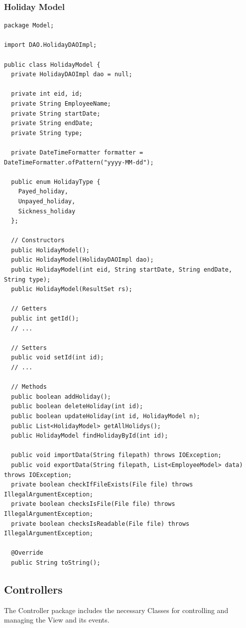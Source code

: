 \documentclass[12pt]{article}
\begin{document}
\subsubsection{Holiday Model}
\begin{lstlisting}
package Model;

import DAO.HolidayDAOImpl;

public class HolidayModel {
  private HolidayDAOImpl dao = null;

  private int eid, id;
  private String EmployeeName;
  private String startDate;
  private String endDate;
  private String type;

  private DateTimeFormatter formatter = DateTimeFormatter.ofPattern("yyyy-MM-dd");

  public enum HolidayType {
    Payed_holiday,
    Unpayed_holiday,
    Sickness_holiday
  };

  // Constructors
  public HolidayModel();
  public HolidayModel(HolidayDAOImpl dao);
  public HolidayModel(int eid, String startDate, String endDate, String type);
  public HolidayModel(ResultSet rs);

  // Getters
  public int getId();
  // ...

  // Setters
  public void setId(int id);
  // ...

  // Methods
  public boolean addHoliday();
  public boolean deleteHoliday(int id);
  public boolean updateHoliday(int id, HolidayModel n);
  public List<HolidayModel> getAllHolidys();
  public HolidayModel findHolidayById(int id);

  public void importData(String filepath) throws IOException;
  public void exportData(String filepath, List<EmployeeModel> data) throws IOException;
  private boolean checkIfFileExists(File file) throws IllegalArgumentException;
  private boolean checksIsFile(File file) throws IllegalArgumentException;
  private boolean checksIsReadable(File file) throws IllegalArgumentException;

  @Override
  public String toString();
\end{lstlisting}

\pagebreak

\subsection{Controllers}

The Controller package includes the necessary Classes for controlling
and managing the View and its events.
\end{document}
